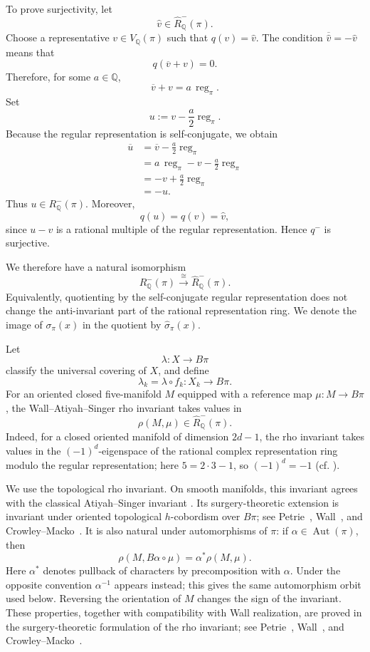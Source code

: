 \documentclass[10pt,reqno]{amsart}
\numberwithin{equation}{section}
\theoremstyle{definition}
\theoremstyle{remark}
\newcommand{\Q}{\mathbb Q}
\newcommand{\Aut}{\operatorname{Aut}}
\begin{document}
To prove surjectivity, let
\[
\widehat v\in\widehat R^-_{\Q}(\pi).
\]
Choose a representative \(v\in V_{\Q}(\pi)\) such that
\(q(v)=\widehat v\). The condition
\(\overline{\widehat v}=-\widehat v\) means that
\[
q(\overline v+v)=0.
\]
Therefore, for some \(a\in\Q\),
\[
\overline v+v
=
a\,\operatorname{reg}_{\pi}.
\]
Set
\[
u
:=
v-\frac{a}{2}\operatorname{reg}_{\pi}.
\]
Because the regular representation is self-conjugate, we obtain
\[
\begin{aligned}
\overline u
&=
\overline v-\frac{a}{2}\operatorname{reg}_{\pi} \\
&=
a\,\operatorname{reg}_{\pi}-v
-\frac{a}{2}\operatorname{reg}_{\pi} \\
&=
-v+\frac{a}{2}\operatorname{reg}_{\pi} \\
&=
-u.
\end{aligned}
\]
Thus \(u\in R^-_{\Q}(\pi)\). Moreover,
\[
q(u)=q(v)=\widehat v,
\]
since \(u-v\) is a rational multiple of the regular representation.
Hence \(q^-\) is surjective.

We therefore have a natural isomorphism
\[
R^-_{\Q}(\pi)
\overset{\cong}{\longrightarrow}
\widehat R^-_{\Q}(\pi).
\]
Equivalently, quotienting by the self-conjugate regular representation
does not change the anti-invariant part of the rational representation
ring. We denote the image of \(\sigma_{\pi}(x)\) in the quotient by
\(\widehat{\sigma}_{\pi}(x)\).

Let
\[
\lambda\colon X\longrightarrow B\pi
\]
classify the universal covering of \(X\), and define
\[
\lambda_k=\lambda\circ f_k\colon X_k\longrightarrow B\pi.
\]
For an oriented closed five-manifold \(M\) equipped with a reference
map \(\mu\colon M\to B\pi\), the Wall--Atiyah--Singer rho invariant
takes values in
\[
\rho(M,\mu)\in\widehat R^-_{\Q}(\pi).
\]
Indeed, for a closed oriented manifold of dimension \(2d-1\), the rho
invariant takes values in the \((-1)^d\)-eigenspace of the rational
complex representation ring modulo the regular representation; here
\(5=2\cdot3-1\), so \((-1)^d=-1\)
(cf. \cite[Section~2.1, Definition~2.2]{CrowleyMacko}).

We use the topological rho invariant. On smooth manifolds, this invariant agrees with the classical
Atiyah--Singer invariant
\cite[Section~7]{AtiyahSingerIII}.
Its surgery-theoretic extension is invariant under oriented
topological \(h\)-cobordism over \(B\pi\); see
Petrie~\cite{Petrie}, Wall~\cite[Chapter~14]{Wall}, and
Crowley--Macko~\cite{CrowleyMacko}.  It is also natural
under automorphisms of \(\pi\): if
\(\alpha\in\Aut(\pi)\), then
\[
\rho(M,B\alpha\circ\mu)
=
\alpha^*\rho(M,\mu).
\]
Here \(\alpha^*\) denotes pullback of characters by precomposition
with \(\alpha\).  Under the opposite convention \(\alpha^{-1}\)
appears instead; this gives the same automorphism orbit used below.
Reversing the orientation of \(M\) changes the sign of the invariant.
These properties, together with compatibility with Wall realization,
are proved in the surgery-theoretic formulation of the rho invariant;
see Petrie~\cite{Petrie}, Wall~\cite[Chapter 14]{Wall}, and
Crowley--Macko~\cite{CrowleyMacko}.
\end{document}
